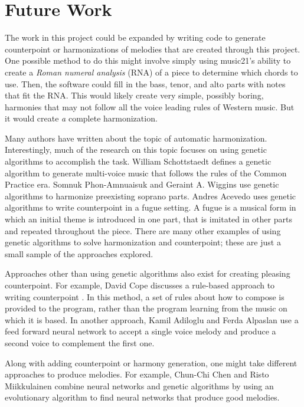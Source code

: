 \section{Future Work} \label{future}

The work in this project could be expanded by writing code to generate counterpoint or harmonizations of melodies that are created through this project.
One possible method to do this might involve simply using music21's ability to create a \textit{Roman numeral analysis} (RNA) of a piece to determine which chords to use.
Then, the software could fill in the bass, tenor, and alto parts with notes that fit the RNA.
This would likely create very simple, possibly boring, harmonies that may not follow all the voice leading rules of Western music.
But it would create \textit{a} complete harmonization.

Many authors have written about the topic of automatic harmonization.
Interestingly, much of the research on this topic focuses on using genetic algorithms to accomplish the task.
William Schottstaedt \cite{schottstdaet_automatic_1989} defines a genetic algorithm to generate multi-voice music that follows the rules of the Common Practice era.
Somnuk Phon-Amnuaisuk and Geraint A. Wiggins \cite{phon-amnuaisuk_four-part_1999} use genetic algorithms to harmonize preexisting soprano parts.
Andres Acevedo \cite{acevedo_fugue_2004} uses genetic algorithms to write counterpoint in a fugue setting.
A fugue is a musical form in which an initial theme is introduced in one part, that is imitated in other parts and repeated throughout the piece.
There are many other examples of using genetic algorithms to solve harmonization and counterpoint; these are just a small sample of the approaches explored.

Approaches other than using genetic algorithms also exist for creating pleasing counterpoint.
For example, David Cope discusses a rule-based approach to writing counterpoint \cite{cope_computers_1991}.
In this method, a set of rules about how to compose is provided to the program, rather than the program learning from the music on which it is based.
In another approach, Kamil Adiloglu and Ferda Alpaslan \cite{adiloglu_machine_2007} use a feed forward neural network to accept a single voice melody and produce a second voice to complement the first one.

Along with adding counterpoint or harmony generation, one might take different approaches to produce melodies.
For example, Chun-Chi Chen and Risto Miikkulainen \cite{chen_creating_2001} combine neural networks and genetic algorithms by using an evolutionary algorithm to find neural networks that produce good melodies.
